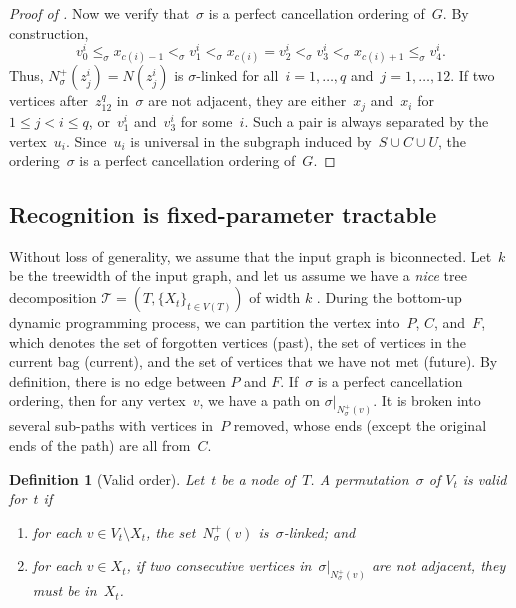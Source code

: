\documentclass[a4paper,cleveref, autoref, 11pt, fleqn, thm-restate]{article}
\theoremstyle{plain}
\newtheorem*{definition}{Definition}
\begin{document}
\begin{proof}[Proof of ]
  Now we verify that~$\sigma$ is a perfect cancellation ordering of~$G$.
  By construction,
  \[
    v^{i}_{0} \le_\sigma x_{c(i)-1}<_\sigma v^{i}_{1} <_\sigma x_{c(i)} = v^{i}_{2} <_\sigma v^{i}_{3} <_\sigma x_{c(i)+1} \le_\sigma v^{i}_{4}.
  \]
  Thus, $N^{+}_{\sigma}(z_j^i) = N(z_j^i)$ is $\sigma$-linked for all~$i = 1, \ldots, q$ and~$j = 1, \ldots, 12$.  %
  If two vertices after~$z_{12}^{q}$ in~$\sigma$ are not adjacent, they are either~$x_{j}$ and~$x_{i}$ for~$1\le j < i\le q$, or~$v_{1}^{i}$ and~$v_{3}^{i}$ for some~$i$.  Such a pair is always separated by the vertex~$u_{i}$.
  Since~$u_{i}$ is universal in the subgraph induced by~$S\cup C\cup U$, the ordering~$\sigma$ is a perfect cancellation ordering of~$G$.
\end{proof}

\subsection{Recognition is fixed-parameter tractable}

Without loss of generality, we assume that the input graph is biconnected.
Let~$k$ be the treewidth of the input graph, and let us assume we have a \textit{nice} tree decomposition $\mathcal{T}=(T,\{X_t\}_{t\in V(T)})$ of width $k$ . During the bottom-up dynamic programming process, we can partition the vertex into~$P$, $C$, and~$F$, which denotes the set of forgotten vertices (past), the set of vertices in the current bag (current), and the set of vertices that we have not met (future).
By definition, there is no edge between $P$ and $F$.
If~$\sigma$ is a perfect cancellation ordering, then for any vertex~$v$, we have a path on $\sigma|_{N_{\sigma}^+(v)}$.
It is broken into several sub-paths with vertices in~$P$ removed, whose ends (except the original ends of the path) are all from~$C$.


\begin{definition}[Valid order]
  \label{def:vao}
  Let~$t$ be a node of~$T$.
  A permutation~$\sigma$ of $V_t$ is valid for~$t$ if
  \begin{enumerate}[label={(V\arabic*)},left=10pt]
    \item for each $v\in V_t\setminus X_t$, the set~$N_{\sigma}^{+}(v)$ is~$\sigma$-linked; and
    \item for each $v\in X_t$, if two consecutive vertices in~$\sigma|_{N_{\sigma}^{+}(v)}$ are not adjacent, they must be in~$X_t$.
  \end{enumerate}
\end{definition}
\end{document}
